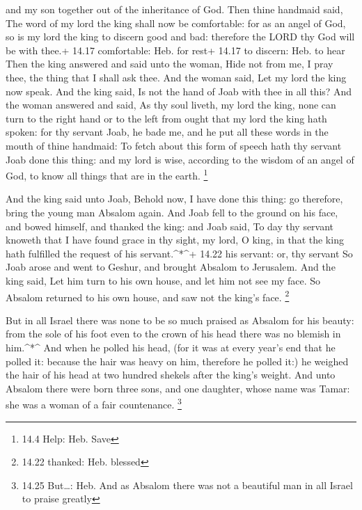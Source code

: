 and my son together out of the inheritance of God.  Then
thine handmaid said, The word of my lord the king shall now be
comfortable: for as an angel of God, so is my lord the king to discern
good and bad: therefore the LORD thy God will be with thee.+ 14.17
comfortable: Heb. for rest+ 14.17 to discern: Heb. to hear 
Then the king answered and said unto the woman, Hide not from me, I pray
thee, the thing that I shall ask thee. And the woman said, Let my lord
the king now speak.  And the king said, Is not the hand of
Joab with thee in all this? And the woman answered and said, As thy soul
liveth, my lord the king, none can turn to the right hand or to the left
from ought that my lord the king hath spoken: for thy servant Joab, he
bade me, and he put all these words in the mouth of thine handmaid:
 To fetch about this form of speech hath thy servant Joab
done this thing: and my lord is wise, according to the wisdom of an
angel of God, to know all things that are in the earth. \footnote{14.4
  Help: Heb. Save}

 And the king said unto Joab, Behold now, I have done this
thing: go therefore, bring the young man Absalom again. 
And Joab fell to the ground on his face, and bowed himself, and thanked
the king: and Joab said, To day thy servant knoweth that I have found
grace in thy sight, my lord, O king, in that the king hath fulfilled the
request of his servant.\^{}*\^{}+ 14.22 his servant: or, thy servant
 So Joab arose and went to Geshur, and brought Absalom to
Jerusalem.  And the king said, Let him turn to his own
house, and let him not see my face. So Absalom returned to his own
house, and saw not the king's face. \footnote{14.22 thanked: Heb.
  blessed}

 But in all Israel there was none to be so much praised as
Absalom for his beauty: from the sole of his foot even to the crown of
his head there was no blemish in him.\^{}*\^{}  And when he
polled his head, (for it was at every year's end that he polled it:
because the hair was heavy on him, therefore he polled it:) he weighed
the hair of his head at two hundred shekels after the king's weight.
 And unto Absalom there were born three sons, and one
daughter, whose name was Tamar: she was a woman of a fair countenance.
\footnote{14.25 But\ldots: Heb. And as Absalom there was not a beautiful
  man in all Israel to praise greatly}

